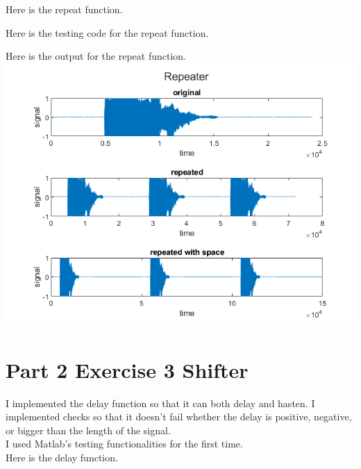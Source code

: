 \documentclass[11pt]{article}
\begin{document}
Here is the repeat function.\\



\vspace{10pt}

Here is the testing code for the repeat function.\\



\vspace{10pt}

Here is the output for the repeat function.\\

\includegraphics[width=\textwidth]{repeater.png}


\pagebreak 
\section{Part 2 Exercise 3 Shifter}

I implemented the delay function so that it can both delay and hasten. I implemented checks so that it doesn't fail whether the delay is positive, negative, or bigger than the length of the signal.\\

I used Matlab's testing functionalities for the first time.\\

Here is the delay function.\\



\vspace{10pt}
\end{document}
